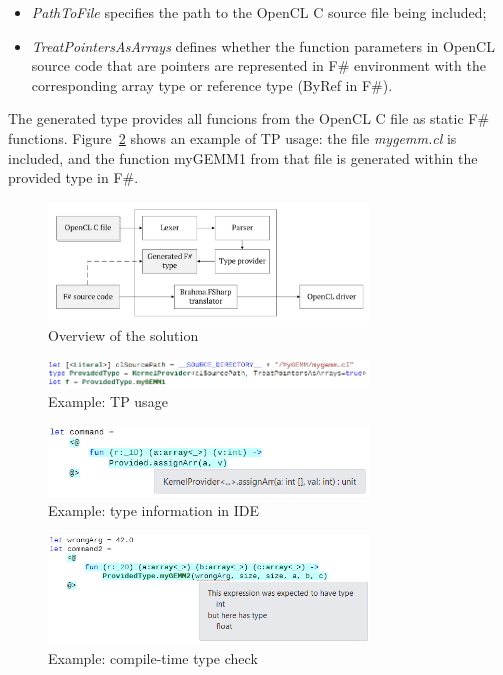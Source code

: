 \documentclass[sigplan,review]{acmart}\settopmatter{printfolios=true}
\begin{document}
\begin{itemize}
  \item \textit{PathToFile} specifies the path to the OpenCL C source file being included;
  \item \textit{TreatPointersAsArrays} defines whether the function parameters in OpenCL source code that are pointers are represented in F\# environment with the corresponding array type or reference type (ByRef in F\#).
\end{itemize}

The generated type provides all funcions from the OpenCL C file as static F\# functions. Figure~\ref{pic:usage} shows an example of TP usage: the file \textit{mygemm.cl} is included, and the function myGEMM1 from that file is generated within the provided type in F\#.

\begin{figure}[h]
\centering
\includegraphics[width=8.5cm]{graphics/architecture.pdf}
\caption{Overview of the solution}
\label{architecture}
\end{figure}

\begin{figure}[h]
\centering
\includegraphics[width=8.5cm]{graphics/example-usage.png}
\caption{Example: TP usage}
\label{pic:usage}
\end{figure}

\begin{figure}[h]
\centering
\includegraphics[width=8.5cm]{graphics/example-suggestion.png}
\caption{Example: type information in IDE}
\label{pic:intellisense}
\end{figure}

\begin{figure}[h]
\centering
\includegraphics[width=8.5cm]{graphics/example-compile-error.png}
\caption{Example: compile-time type check}
\label{pic:error}
\end{figure}
\end{document}
